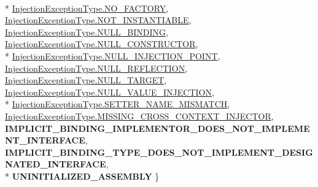 \begin{DoxyCompactItemize}
\\*
\hyperlink{namespacestrange_1_1extensions_1_1injector_1_1api_a465caee64cba80e952ad7dd9a050e6c3a01db55ee4f3906c693e2699428696a5b}{Injection\-Exception\-Type.\-N\-O\-\_\-\-F\-A\-C\-T\-O\-R\-Y}, 
\hyperlink{namespacestrange_1_1extensions_1_1injector_1_1api_a465caee64cba80e952ad7dd9a050e6c3a7b244407b8ac6cc4f5b40c982a08c6a7}{Injection\-Exception\-Type.\-N\-O\-T\-\_\-\-I\-N\-S\-T\-A\-N\-T\-I\-A\-B\-L\-E}, 
\hyperlink{namespacestrange_1_1extensions_1_1injector_1_1api_a465caee64cba80e952ad7dd9a050e6c3a35310c46c16e400ec14d3f312e93ec71}{Injection\-Exception\-Type.\-N\-U\-L\-L\-\_\-\-B\-I\-N\-D\-I\-N\-G}, 
\hyperlink{namespacestrange_1_1extensions_1_1injector_1_1api_a465caee64cba80e952ad7dd9a050e6c3ae56115cda206190a98cdfbc8134f06fb}{Injection\-Exception\-Type.\-N\-U\-L\-L\-\_\-\-C\-O\-N\-S\-T\-R\-U\-C\-T\-O\-R}, 
\\*
\hyperlink{namespacestrange_1_1extensions_1_1injector_1_1api_a465caee64cba80e952ad7dd9a050e6c3a89649dd9e221e1c72234ad07e5438f46}{Injection\-Exception\-Type.\-N\-U\-L\-L\-\_\-\-I\-N\-J\-E\-C\-T\-I\-O\-N\-\_\-\-P\-O\-I\-N\-T}, 
\hyperlink{namespacestrange_1_1extensions_1_1injector_1_1api_a465caee64cba80e952ad7dd9a050e6c3addad0bdbc0ef75cea9fd75de89fcadd1}{Injection\-Exception\-Type.\-N\-U\-L\-L\-\_\-\-R\-E\-F\-L\-E\-C\-T\-I\-O\-N}, 
\hyperlink{namespacestrange_1_1extensions_1_1injector_1_1api_a465caee64cba80e952ad7dd9a050e6c3a8a7371180fcfcf8d19f526506f886887}{Injection\-Exception\-Type.\-N\-U\-L\-L\-\_\-\-T\-A\-R\-G\-E\-T}, 
\hyperlink{namespacestrange_1_1extensions_1_1injector_1_1api_a465caee64cba80e952ad7dd9a050e6c3ab91f1fd5e0526d191cf6d1d871b77685}{Injection\-Exception\-Type.\-N\-U\-L\-L\-\_\-\-V\-A\-L\-U\-E\-\_\-\-I\-N\-J\-E\-C\-T\-I\-O\-N}, 
\\*
\hyperlink{namespacestrange_1_1extensions_1_1injector_1_1api_a465caee64cba80e952ad7dd9a050e6c3aa2bdd50d3a2f2f510f0209f648f0c0b6}{Injection\-Exception\-Type.\-S\-E\-T\-T\-E\-R\-\_\-\-N\-A\-M\-E\-\_\-\-M\-I\-S\-M\-A\-T\-C\-H}, 
\hyperlink{namespacestrange_1_1extensions_1_1injector_1_1api_a465caee64cba80e952ad7dd9a050e6c3a24f92bc48507459616449c4f27267560}{Injection\-Exception\-Type.\-M\-I\-S\-S\-I\-N\-G\-\_\-\-C\-R\-O\-S\-S\-\_\-\-C\-O\-N\-T\-E\-X\-T\-\_\-\-I\-N\-J\-E\-C\-T\-O\-R}, 
{\bfseries I\-M\-P\-L\-I\-C\-I\-T\-\_\-\-B\-I\-N\-D\-I\-N\-G\-\_\-\-I\-M\-P\-L\-E\-M\-E\-N\-T\-O\-R\-\_\-\-D\-O\-E\-S\-\_\-\-N\-O\-T\-\_\-\-I\-M\-P\-L\-E\-M\-E\-N\-T\-\_\-\-I\-N\-T\-E\-R\-F\-A\-C\-E}, 
{\bfseries I\-M\-P\-L\-I\-C\-I\-T\-\_\-\-B\-I\-N\-D\-I\-N\-G\-\_\-\-T\-Y\-P\-E\-\_\-\-D\-O\-E\-S\-\_\-\-N\-O\-T\-\_\-\-I\-M\-P\-L\-E\-M\-E\-N\-T\-\_\-\-D\-E\-S\-I\-G\-N\-A\-T\-E\-D\-\_\-\-I\-N\-T\-E\-R\-F\-A\-C\-E}, 
\\*
{\bfseries U\-N\-I\-N\-I\-T\-I\-A\-L\-I\-Z\-E\-D\-\_\-\-A\-S\-S\-E\-M\-B\-L\-Y}
 \}
\end{DoxyCompactItemize}


